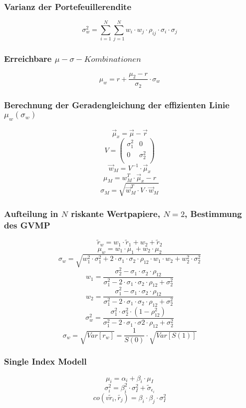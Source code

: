 \subsubsection{Varianz der Portefeuillerendite}
\[\sigma_w^2 = \sum_{i=1}^{N}\sum_{j=1}^{N} w_i \cdot w_j \cdot \rho_{ij} \cdot \sigma_i \cdot \sigma_j\]

\subsubsection{Erreichbare \(\mu-\sigma-Kombinationen\)}
\[\mu_w = r + \frac{\mu_2 - r}{\sigma_2} \cdot \sigma_w \]

\subsubsection{Berechnung der Geradengleichung der effizienten Linie \(\mu_w(\sigma_w)\)}
\[\vec{\mu}_x = \vec{\mu} - \vec{r}\]
\[V = \begin{pmatrix} \sigma_1^2 & 0 \\ 0 & \sigma_2^2 \\ \end{pmatrix}\]
\[\vec{w}_M = V^{-1} \cdot \vec{\mu}_x\]
\[\mu_M = w_M^T \cdot \vec{\mu}_x - r\]
\[\sigma_M = \sqrt{\vec{w}_M^T \cdot V \cdot \vec{w}_M}\]

\subsubsection{Aufteilung in \(N\) riskante Wertpapiere, \(N = 2\), Bestimmung des GVMP}
\[\tilde{r}_w = w_1 \cdot \tilde{r}_1 + w_2 + \tilde{r}_2\]
\[\mu_w = w_1 \cdot \mu_1 + w_2 \cdot \mu_2\]
\[\sigma_w = \sqrt{w_1^2 \cdot \sigma_1^2 + 2 \cdot \sigma_1 \cdot \sigma_2 \cdot \rho_{12} \cdot w_1 \cdot w_2 + w_2^2 \cdot \sigma_2^2}\]
\[w_1 = \frac{\sigma_2^2-\sigma_1 \cdot \sigma_2 \cdot \rho_{12}}{\sigma_1^2-2 \cdot \sigma_1 \cdot \sigma_2 \cdot \rho_{12} + \sigma_2^2}\]
\[w_2 = \frac{\sigma_1^2 - \sigma_1 \cdot \sigma_2 \cdot \rho_{12}}{\sigma_1^2 - 2 \cdot \sigma_1 \cdot \sigma_2 \cdot \rho_{12} + \sigma_2^2}\]
\[\sigma_w^2 = \frac{\sigma_1^2 \cdot \sigma_2^2 \cdot (1 - \rho_{12}^2)}{\sigma_1^2 - 2 \cdot \sigma_1 \cdot \sigma2 \cdot \rho_{12} + \sigma_2^2}\]
\[\sigma_w = \sqrt{Var[r_w]} = \frac{1}{S(0)} \cdot \sqrt{Var[S(1)]} \]

\subsubsection{Single Index Modell}
\[\mu_i = \alpha_i + \beta_i \cdot \mu_I\]
\[\sigma_i^2 = \beta_i^2 \cdot \sigma_I^2 + \tilde{\sigma}_{\epsilon_i}\]
\[co(v\tilde{r}_i, \tilde{r_j}) = \beta_i \cdot \beta_j \cdot \sigma_I^2\]


